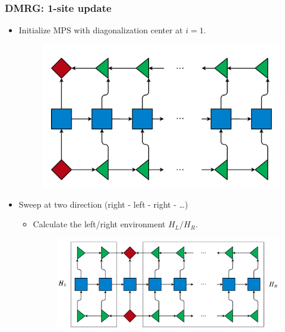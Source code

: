 \documentclass{beamer}
\begin{document}
\begin{frame}
	\frametitle{DMRG: 1-site update}
	\begin{multicols*}{2}
	\begin{itemize}
		\item Initialize MPS with diagonalization center at $i=1$.
		\begin{figure}[H]
			\includegraphics[width=1. \linewidth]{images/Initialization.pdf}
		\end{figure}
		\newpage
		\item Sweep at two direction (right - left - right - \dots)
		\begin{itemize}
			\item Calculate the left/right environment $H_L/H_R$.
			\begin{figure}[H]
				\includegraphics[width=1. \linewidth]{images/LRenv1.pdf}
			\end{figure}
		\end{itemize}
	\end{itemize}
	\end{multicols*}
\end{frame}
\end{document}
